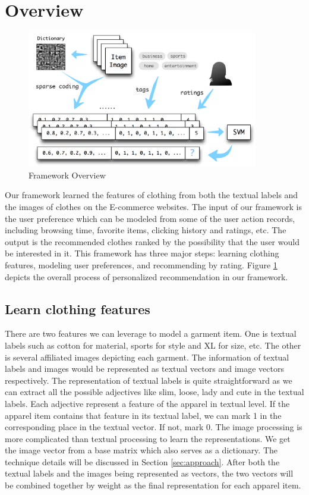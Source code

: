 \section{Overview}\label{sec:overview}

\begin{figure}
  \centering
  \includegraphics[width=0.9\textwidth]{framework}
  \caption{Framework Overview}
  \label{fig:overview}
\end{figure}

Our framework learned the features of clothing from both the textual labels and the images of clothes on the E-commerce websites. The input of our framework is the user preference which can be modeled from some of the user action records, including browsing time, favorite items, clicking history and ratings, etc. The output is the recommended clothes ranked by the possibility that the user would be interested in it. This framework has three major steps: learning clothing features,
modeling user preferences, and recommending by rating. Figure \ref{fig:overview} depicts the overall process of personalized recommendation in our framework.

\subsection{Learn clothing features}
There are two features we can leverage to model a garment item. One is textual labels such as cotton for material, sports for style and XL for size, etc. The other is several affiliated images depicting each garment. The information of textual labels and images would be represented as textual vectors and image vectors respectively. The representation of textual labels is quite straightforward as we can extract all the possible adjectives like slim, loose, lady and cute in the textual
labels. Each adjective represent a feature of the apparel in textual level. If the apparel item contains that feature in its textual label, we can mark 1 in the corresponding place in the textual vector. If not, mark 0. The image processing is more complicated than textual processing to learn the representations. We get the image vector from a base matrix which also serves as a dictionary. The technique details will be discussed in Section \ref{sec:approach}. After both the textual labels
and the images being represented as vectors, the two vectors will be combined together by weight as the final representation for each apparel item.

